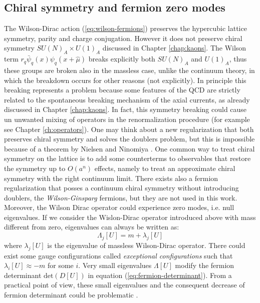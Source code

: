 \documentclass[english, LaM, oneside, noexaminfo]{sapthesis}
\begin{document}
\subsection{Chiral symmetry and fermion zero modes}\label{subsec:zero-modes}
\noindent
The Wilson-Dirac action (\ref{eq:wilson-fermions}) preserves the hypercubic lattice symmetry, parity and charge conjugation.
However it does not preserve chiral symmetry $SU(N)_A \times U(1)_A$ discussed in Chapter \ref{chap:kaons}.
The Wilson term $r_q \bar \psi_q(x) \psi_q (x + \hat \mu)$ breaks explicitly both $SU(N)_A$ and $U(1)_A$, thus these groups are broken also in the massless case, unlike the continuum theory, in which the breakdown occurs for other reasons (not explicitly).
In principle this breaking represents a problem because some features of the QCD are strictly related to the spontaneous breaking mechanism of the axial currents, as already discussed in Chapter \ref{chap:kaons}.
In fact, this symmetry breaking could cause un unwanted mixing of operators in the renormalization procedure (for example see Chapter \ref{ch:operators}).
One may think about a new regularization that both preserves chiral symmetry and solves the doublers problem, but this is impossible because of a theorem by Nielsen and Ninomiya \cite{montvay-munster}.
One common way to treat chiral symmetry on the lattice is to add some counterterms to observables that restore the symmetry up to $O(a^n)$ effects, namely to treat an approximate chiral symmetry with the right continuum limit.
There exists also a fermion regularization that posses a continuum chiral symmetry without introducing doublers, the {\it Wilson-Ginsparg} fermions, but they are not used in this work.
\newline
Moreover, the Wilson Dirac operator could experience zero modes, i.e. null eigenvalues.
If we consider the Wislon-Dirac operator introduced above with mass different from zero, eigenvalues can always be written as:
\begin{equation}\label{eq:eigenvalues}
    \Lambda_j [U] = m + \lambda_j [U]
\end{equation}
where $\lambda_j [U]$ is the eigenvalue of massless Wilson-Dirac operator.
There could exist some gauge configurations called {\it exceptional configurations} such that $\lambda_i [U] \approx -m$ for some $i$. 
Very small eigenvalues $\Lambda [U]$ modify the fermion determinant $\text{det}(D[U])$ in equation (\ref{eq:fermion-determinant}).
From a practical point of view, these small eigenvalues and the consequent decrease of fermion determinant could be problematic \cite{tmLQCD}.
\end{document}
